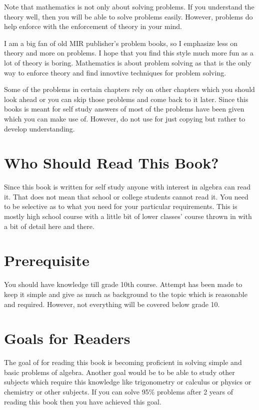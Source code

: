 Note that mathematics is not only about solving problems. If you understand the theory well, then you will be able to solve
problems easily. However, problems do help enforce with the enforcement of theory in your mind.

I am a big fan of old MIR publisher's problem books, so I emphasize less on theory and more on problems. I hope that you find
this style much more fun as a lot of theory is boring. Mathematics is about problem solving as that is the only way to
enforce theory and find innovtive techniques for problem solving.

Some of the problems in certain chapters rely on other chapters which you should look ahead or you can skip those problems and come
back to it later. Since this books is meant for self study answers of most of the problems have been given which you can make use of.
However, do not use for just copying but rather to develop understanding.

\section*{Who Should Read This Book?}
Since this book is written for self study anyone with interest in algebra can read it. That does not mean that school or college
students cannot read it. You need to be selective as to what you need for your particular requirements. This is mostly high school
course with a little bit of lower classes' course thrown in with a bit of detail here and there.

\section*{Prerequisite}
You should have knowledge till grade 10th course. Attempt has been made to keep it simple and give as much as background to the
topic which is reasonable and required. However, not everything will be covered below grade 10.

\section*{Goals for Readers}
The goal of for reading this book is becoming proficient in solving simple and basic problems of algebra. Another goal would be to
be able to study other subjects which require this knowledge like trigonometry or calculus or physics or chemistry or other
subjects. If you can solve 95\% problems after 2 years of reading this book then you have achieved this goal.

